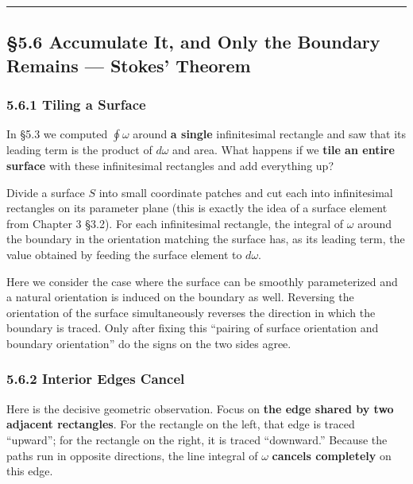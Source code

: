 \begin{center}\rule{0.5\linewidth}{0.5pt}\end{center}

\hypertarget{accumulate-it-and-only-the-boundary-remains-stokes-theorem}{%
\subsection{§5.6 Accumulate It, and Only the Boundary Remains ---
Stokes'
Theorem}\label{accumulate-it-and-only-the-boundary-remains-stokes-theorem}}

\hypertarget{tiling-a-surface}{%
\subsubsection{5.6.1 Tiling a Surface}\label{tiling-a-surface}}

In §5.3 we computed \(\oint \omega\) around \textbf{a single}
infinitesimal rectangle and saw that its leading term is the product of
\(d\omega\) and area. What happens if we \textbf{tile an entire surface}
with these infinitesimal rectangles and add everything up?

Divide a surface \(S\) into small coordinate patches and cut each into
infinitesimal rectangles on its parameter plane (this is exactly the
idea of a surface element from Chapter 3 §3.2). For each infinitesimal
rectangle, the integral of \(\omega\) around the boundary in the
orientation matching the surface has, as its leading term, the value
obtained by feeding the surface element to \(d\omega\).

Here we consider the case where the surface can be smoothly
parameterized and a natural orientation is induced on the boundary as
well. Reversing the orientation of the surface simultaneously reverses
the direction in which the boundary is traced. Only after fixing this
``pairing of surface orientation and boundary orientation'' do the signs
on the two sides agree.

\hypertarget{interior-edges-cancel}{%
\subsubsection{5.6.2 Interior Edges
Cancel}\label{interior-edges-cancel}}

Here is the decisive geometric observation. Focus on
\textbf{the edge shared by two adjacent rectangles}. For the rectangle
on the left, that edge is traced ``upward''; for the rectangle on the
right, it is traced ``downward.'' Because the paths run in opposite
directions, the line integral of \(\omega\) \textbf{cancels completely}
on this edge.

